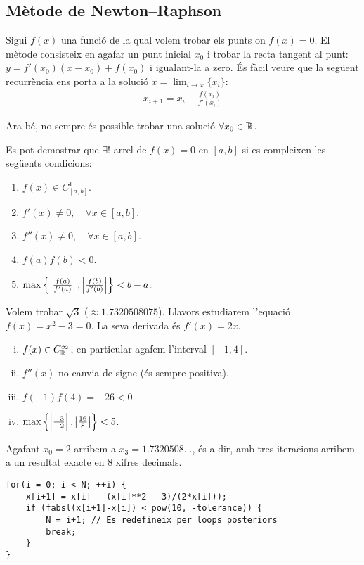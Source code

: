 \subsection{Mètode de Newton--Raphson}
Sigui $f(x)$ una funció de la qual volem trobar els punts on $f(x) = 0$. El mètode consisteix en agafar un punt inicial $x_{0}$ i trobar la recta tangent al punt: $y = f'(x_{0}) (x-x_{0}) + f(x_{0})$ i igualant-la a zero. És fàcil veure que la següent recurrència ens porta a la solució $x = \lim_{i \to x} \{ x_{i} \}$:
\begin{align}
    \boxed{x_{i+1} = x_{i} - \frac{f(x_{i})}{f'(x_{i})}}
\end{align}

Ara bé, no sempre és possible trobar una solució $\forall x_{0} \in \mathbb{R}$.
\begin{thm}
    Es pot demostrar que $\exists!$ arrel de $f(x) = 0$ en $[a,b]$ si es compleixen les següents condicions:
    \begin{enumerate}
        \item $f(x) \in C^{1}_{[a,b]}$.
        \item $f'(x) \neq 0, \quad \forall x \in [a,b]$.
        \item $f''(x) \neq 0, \quad \forall x \in [a,b]$.
        \item $f(a) f(b) < 0$.
        \item $\max \left\{  \left| \frac{f(a)}{f'(a)} \right|, \left| \frac{f(b)}{f'(b)} \right|  \right\} < b-a$.
    \end{enumerate}
\end{thm}

\begin{example}\label{ex:newton}
    Volem trobar $\sqrt{3}$ ($\approx \num{1.7320508075}$). Llavors estudiarem l'equació $f(x) = x^{2} - 3 = 0$. La seva derivada és $f'(x) = 2x$.
    \begin{enumerate}[i)]
        \item $f(x) \in C^{\infty}_{\mathbb{R}}$, en particular agafem l'interval $[-1,4]$.
        \item $f''(x)$ no canvia de signe (és sempre positiva).
        \item $f(-1) f(4) = -26 < 0$.
        \item $\max \left\{  \left| \frac{-3}{-2} \right|, \left| \frac{16}{8} \right|  \right\} < 5$.
    \end{enumerate}
    Agafant $x_{0} = 2$ arribem a $x_{3} = \num{1.7320508}\dots$, és a dir, amb tres iteracions arribem a un resultat exacte en 8 xifres decimals.

\begin{Verbatim}
for(i = 0; i < N; ++i) {
	x[i+1] = x[i] - (x[i]**2 - 3)/(2*x[i]));
	if (fabsl(x[i+1]-x[i]) < pow(10, -tolerance)) {
		N = i+1; // Es redefineix per loops posteriors
		break;
	}
}
\end{Verbatim}
\end{example}


